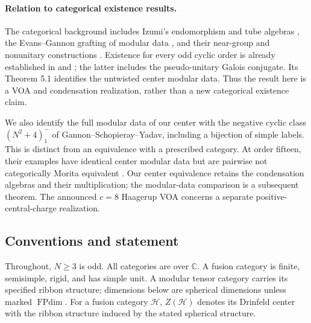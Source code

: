 \documentclass[11pt,a4paper]{article}
\numberwithin{equation}{section}
\theoremstyle{definition}\newtheorem{definition}[theorem]{Definition}
\theoremstyle{remark}\newtheorem{remark}[theorem]{Remark}
\begin{document}
\paragraph{Relation to categorical existence results.}
The categorical background includes Izumi's endomorphism and tube
algebras \cite{izumi}, the Evans--Gannon grafting of modular data
\cite[Section 3.3]{evansgannon2011}, and their near-group and
nonunitary constructions \cite{evansgannon2014,evansgannon2017}.
Existence for every odd cyclic order is already established in
\cite{huangcyclic} and \cite[Theorem A(1)]{gsy}; the latter includes
the pseudo-unitary Galois conjugate. Its Theorem 5.1 identifies the
untwisted center modular data. Thus the result here is a VOA and
condensation realization, rather than a new categorical existence
claim.

We also identify the full modular data of our center with the
negative cyclic class $(N^2+4)^-_1$ of Gannon--Schopieray--Yadav,
including a bijection of simple labels. This is distinct from an
equivalence with a prescribed category. At order fifteen, their
examples have identical center modular data but are pairwise not
categorically Morita equivalent \cite[Corollary 5.9]{gsy}.
Our center equivalence retains the condensation algebras and their
multiplication; the modular-data comparison is a subsequent theorem.
The announced $c=8$ Haagerup VOA \cite{riesenc8} concerns a separate
positive-central-charge realization.

\subsection{Conventions and statement}

Throughout, $N\geq3$ is odd. All categories are over $\mathbb C$. A fusion category is finite,
semisimple, rigid, and has simple unit. A modular tensor category carries
its specified ribbon structure; dimensions below are spherical dimensions
unless marked $\operatorname{FPdim}$. For a fusion category $\mathcal H$,
$Z(\mathcal H)$ denotes its Drinfeld center with the ribbon structure
induced by the stated spherical structure.
\end{document}
